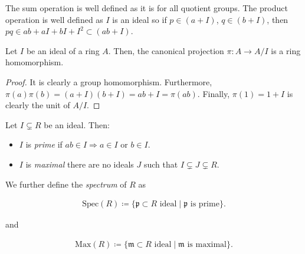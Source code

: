         \begin{rk}
            The sum operation is well defined as it is for all quotient groups.
            The product operation is well defined as $I$ is an ideal so if $p \in (a + I)$, $q \in (b + I)$,
            then $pq \in ab + aI + bI + I^2 \subset (ab + I)$.
        \end{rk}

        \begin{prop}
            Let $I$ be an ideal of a ring $A$.
            Then, the canonical projection $\pi: A \rightarrow A/I$ is a ring homomorphism.
        \end{prop}

                \begin{proof}
                    It is clearly a group homomorphism.
                    Furthermore, $\pi(a) \pi(b) = (a + I) (b + I) = ab + I = \pi(ab)$.
                    Finally, $\pi(1) = 1 + I$ is clearly the unit of $A/I$.
                \end{proof}

        \begin{defn}
            Let $I \subsetneq R$ be an ideal.
            Then:

            \begin{itemize}
                \item $I$ is \emph{prime} if $ab \in I \Rightarrow a \in I \text{ or } b \in I$.
                \item $I$ is \emph{maximal} there are no ideals $J$ such that $I \subsetneq J \subsetneq R$.
            \end{itemize}

            We further define the \emph{spectrum} of $R$ as

            \begin{align}
                \text{Spec}(R) \coloneqq \{\mathfrak{p} \subset R \text{ ideal} \mid \mathfrak{p} \text{ is prime}\}. \nonumber
            \end{align}

            and

            \begin{align}
                \text{Max}(R) \coloneqq \{\mathfrak{m} \subset R \text{ ideal} \mid \mathfrak{m} \text{ is maximal}\}. \nonumber
            \end{align}

        \end{defn}

